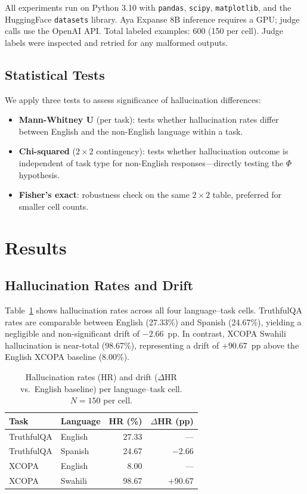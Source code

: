 \documentclass[11pt]{article}
\begin{document}
All experiments run on Python 3.10 with \texttt{pandas}, \texttt{scipy},
\texttt{matplotlib}, and the HuggingFace \texttt{datasets} library. Aya Expanse 8B
inference requires a GPU; judge calls use the OpenAI API. Total labeled examples: 600
(150 per cell). Judge labels were inspected and retried for any malformed outputs.

\subsection{Statistical Tests}

We apply three tests to assess significance of hallucination differences:

\begin{itemize}
  \item \textbf{Mann-Whitney U} (per task): tests whether hallucination rates differ
        between English and the non-English language within a task.
  \item \textbf{Chi-squared} ($2{\times}2$ contingency): tests whether hallucination
        outcome is independent of task type for non-English responses---directly testing
        the $\Phi$ hypothesis.
  \item \textbf{Fisher's exact}: robustness check on the same $2{\times}2$ table,
        preferred for smaller cell counts.
\end{itemize}

\section{Results}

\subsection{Hallucination Rates and Drift}

Table~\ref{tab:hr} shows hallucination rates across all four language--task cells.
TruthfulQA rates are comparable between English (27.33\%) and Spanish (24.67\%),
yielding a negligible and non-significant drift of $-2.66$~pp. In contrast, XCOPA
Swahili hallucination is near-total (98.67\%), representing a drift of $+90.67$~pp
above the English XCOPA baseline (8.00\%).

\begin{table}[t]
\centering
\small
\begin{tabular}{llrr}
\toprule
\textbf{Task} & \textbf{Language} & \textbf{HR (\%)} & \textbf{$\Delta$HR (pp)} \\
\midrule
TruthfulQA & English  & 27.33 & ---      \\
TruthfulQA & Spanish  & 24.67 & $-2.66$  \\
XCOPA      & English  &  8.00 & ---      \\
XCOPA      & Swahili  & 98.67 & $+90.67$ \\
\bottomrule
\end{tabular}
\caption{Hallucination rates (HR) and drift ($\Delta$HR vs.\ English baseline)
per language--task cell. $N=150$ per cell.}
\label{tab:hr}
\end{table}
\end{document}

